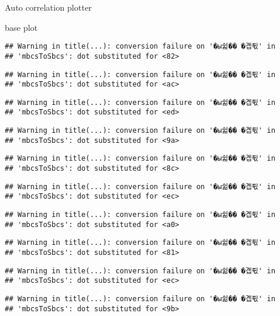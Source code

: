 \documentclass[ignorenonframetext,]{beamer}
\begin{document}
\begin{frame}[fragile]{Auto correlation plotter}
\begin{block}{base plot}
\begin{verbatim}
## Warning in title(...): conversion failure on '�ы쉶�� �곕튃' in
## 'mbcsToSbcs': dot substituted for <82>
\end{verbatim}

\begin{verbatim}
## Warning in title(...): conversion failure on '�ы쉶�� �곕튃' in
## 'mbcsToSbcs': dot substituted for <ac>
\end{verbatim}

\begin{verbatim}
## Warning in title(...): conversion failure on '�ы쉶�� �곕튃' in
## 'mbcsToSbcs': dot substituted for <ed>
\end{verbatim}

\begin{verbatim}
## Warning in title(...): conversion failure on '�ы쉶�� �곕튃' in
## 'mbcsToSbcs': dot substituted for <9a>
\end{verbatim}

\begin{verbatim}
## Warning in title(...): conversion failure on '�ы쉶�� �곕튃' in
## 'mbcsToSbcs': dot substituted for <8c>
\end{verbatim}

\begin{verbatim}
## Warning in title(...): conversion failure on '�ы쉶�� �곕튃' in
## 'mbcsToSbcs': dot substituted for <ec>
\end{verbatim}

\begin{verbatim}
## Warning in title(...): conversion failure on '�ы쉶�� �곕튃' in
## 'mbcsToSbcs': dot substituted for <a0>
\end{verbatim}

\begin{verbatim}
## Warning in title(...): conversion failure on '�ы쉶�� �곕튃' in
## 'mbcsToSbcs': dot substituted for <81>
\end{verbatim}

\begin{verbatim}
## Warning in title(...): conversion failure on '�ы쉶�� �곕튃' in
## 'mbcsToSbcs': dot substituted for <ec>
\end{verbatim}

\begin{verbatim}
## Warning in title(...): conversion failure on '�ы쉶�� �곕튃' in
## 'mbcsToSbcs': dot substituted for <9b>
\end{verbatim}


\end{block}
\end{frame}
\end{document}
